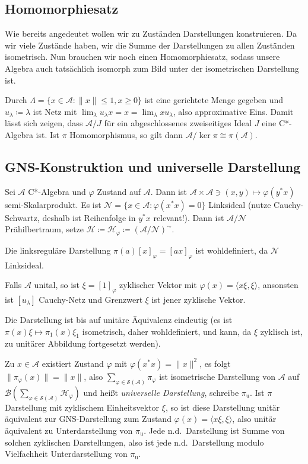 \documentclass[11pt,a4paper]{scrartcl}
\newcommand{\Hc}{\mathcal{H}}
\newcommand{\A}{\mathcal{A}}
\newcommand{\B}{\mathcal{B}}
\newcommand{\Nc}{\mathcal{N}}
\theoremstyle{plain}
\theoremstyle{definition}
\theoremstyle{remark}
\begin{document}
\subsection{Homomorphiesatz}

Wie bereits angedeutet wollen wir zu Zuständen Darstellungen konstruieren. Da wir viele Zustände haben, wir die Summe der Darstellungen zu allen Zuständen isometrisch. Nun brauchen wir noch einen Homomorphiesatz, sodass unsere Algebra auch tatsächlich isomorph zum Bild unter der isometrischen Darstellung ist.

Durch $\Lambda=\{ x\in \A: \|x\|\leq 1, x\geq 0\}$ ist eine gerichtete Menge gegeben und $u_\lambda\coloneqq \lambda$ ist Netz mit $\lim_\lambda u_\lambda x=x=\lim_\lambda xu_\lambda$, also approximative Eins. Damit lässt sich zeigen, dass $\A/J$ für ein abgeschlossenes zweiseitiges Ideal $J$ eine C*-Algebra ist. Ist $\pi$ Homomorphismus, so gilt dann $\A/\ker \pi \cong \pi(\A)$.

\subsection{GNS-Konstruktion und universelle Darstellung}

Sei $\A$ C*-Algebra und $\varphi$ Zustand auf $\A$. Dann ist $\A\times \A\ni (x,y)\mapsto \varphi(y^*x)$ semi-Skalarprodukt. Es ist $\Nc=\{x\in \A: \varphi(x^*x)=0\}$ Linksideal (nutze Cauchy-Schwartz, deshalb ist Reihenfolge in $y^*x$ relevant!). Dann ist $\A/\Nc$ Prähilbertraum, setze $\Hc\coloneqq \Hc_\varphi \coloneqq (\A/\Nc)^{\sim}$.

Die linksreguläre Darstellung $\pi(a)[x]_\varphi=[ax]_\varphi$ ist wohldefiniert, da $\Nc$ Linksideal. 

Falls $\A$ unital, so ist $\xi=[1]_\varphi$ zyklischer Vektor mit $\varphi(x)=\langle x\xi, \xi \rangle$, ansonsten ist $[u_\lambda]$ Cauchy-Netz und Grenzwert $\xi$ ist jener zyklische Vektor.

Die Darstellung ist bis auf unitäre Äquivalenz eindeutig (es ist $\pi(x)\xi \mapsto \pi_1(x)\xi_1$ isometrisch, daher wohldefiniert, und kann, da $\xi$ zyklisch ist, zu unitärer Abbildung fortgesetzt werden).

Zu $x\in \A$ existiert Zustand $\varphi$ mit $\varphi(x^*x)=\|x\|^2$, es folgt $\|\pi_\varphi(x)\|=\|x\|$, also $\sum_{\varphi\in \mathcal{S}(\A)} \pi_\varphi$ ist isometrische Darstellung von $\A$ auf $\B(\sum_{\varphi\in \mathcal{S}(\A)} \Hc_\varphi)$ und heißt \emph{universelle Darstellung}, schreibe $\pi_\mathrm{u}$. Ist $\pi$ Darstellung mit zyklischem Einheitsvektor $\xi$, so ist diese Darstellung unitär äquivalent zur GNS-Darstellung zum Zustand $\varphi(x)=\langle x\xi, \xi\rangle$, also unitär äquivalent zu Unterdarstellung von $\pi_\mathrm{u}$. Jede n.d.\ Darstellung ist Summe von solchen zyklischen Darstellungen, also ist jede n.d.\ Darstellung modulo Vielfachheit Unterdarstellung von $\pi_\mathrm{u}$.
\end{document}
